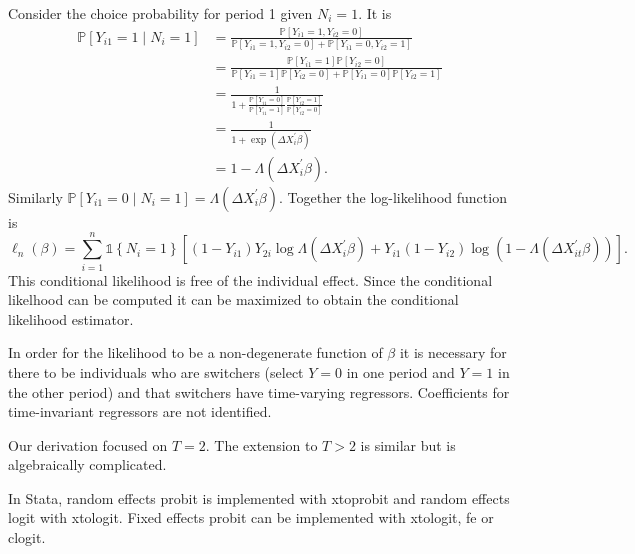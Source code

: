 \documentclass[10pt]{article}
\begin{document}
Consider the choice probability for period 1 given $N_{i}=1$. It is
$$
\begin{aligned}
\mathbb{P}\left[Y_{i 1}=1 \mid N_{i}=1\right] &=\frac{\mathbb{P}\left[Y_{i 1}=1, Y_{i 2}=0\right]}{\mathbb{P}\left[Y_{i 1}=1, Y_{i 2}=0\right]+\mathbb{P}\left[Y_{i 1}=0, Y_{i 2}=1\right]} \\
&=\frac{\mathbb{P}\left[Y_{i 1}=1\right] \mathbb{P}\left[Y_{i 2}=0\right]}{\mathbb{P}\left[Y_{i 1}=1\right] \mathbb{P}\left[Y_{i 2}=0\right]+\mathbb{P}\left[Y_{i 1}=0\right] \mathbb{P}\left[Y_{i 2}=1\right]} \\
&=\frac{1}{1+\frac{\mathbb{P}\left[Y_{i 1}=0\right]}{\mathbb{P}\left[Y_{i 1}=1\right]} \frac{\mathbb{P}\left[Y_{i 2}=1\right]}{\mathbb{P}\left[Y_{i 2}=0\right]}} \\
&=\frac{1}{1+\exp \left(\Delta X_{i}^{\prime} \beta\right)} \\
&=1-\Lambda\left(\Delta X_{i}^{\prime} \beta\right) .
\end{aligned}
$$
Similarly $\mathbb{P}\left[Y_{i 1}=0 \mid N_{i}=1\right]=\Lambda\left(\Delta X_{i}^{\prime} \beta\right)$. Together the log-likelihood function is
$$
\ell_{n}(\beta)=\sum_{i=1}^{n} \mathbb{1}\left\{N_{i}=1\right\}\left[\left(1-Y_{i 1}\right) Y_{2 i} \log \Lambda\left(\Delta X_{i}^{\prime} \beta\right)+Y_{i 1}\left(1-Y_{i 2}\right) \log \left(1-\Lambda\left(\Delta X_{i t}^{\prime} \beta\right)\right)\right] .
$$
This conditional likelihood is free of the individual effect. Since the conditional likelhood can be computed it can be maximized to obtain the conditional likelihood estimator.

In order for the likelihood to be a non-degenerate function of $\beta$ it is necessary for there to be individuals who are switchers (select $Y=0$ in one period and $Y=1$ in the other period) and that switchers have time-varying regressors. Coefficients for time-invariant regressors are not identified.

Our derivation focused on $T=2$. The extension to $T>2$ is similar but is algebraically complicated.

In Stata, random effects probit is implemented with xtoprobit and random effects logit with xtologit. Fixed effects probit can be implemented with xtologit, fe or clogit.
\end{document}
